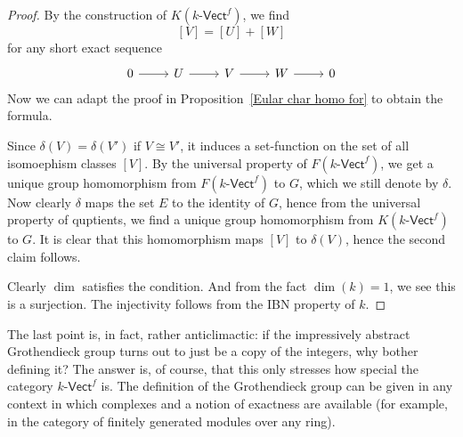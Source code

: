 \begin{proof}
By the construction of $K(\text{$k$-$\mathsf{Vect}^{f}$})$, we find
\[[V]=[U]+[W]\]
for any short exact sequence
\[\begin{tikzcd}
0\ar[r]&U\ar[r]&V\ar[r]&W\ar[r]&0
\end{tikzcd}\]
Now we can adapt the proof in Proposition~\ref{Eular char homo for} to obtain the formula.\par
Since $\delta(V)=\delta(V')$ if $V\cong V'$, it induces a set-function on the set of all isomoephism classes $[V]$. By the universal property of $F(\text{$k$-$\mathsf{Vect}^{f}$})$, we get a unique group homomorphism from $F(\text{$k$-$\mathsf{Vect}^{f}$})$ to $G$, which we still denote by $\delta$. Now clearly $\delta$ maps the set $E$ to the identity of $G$, hence from the universal property of quptients, we find a unique group homomorphism from $K(\text{$k$-$\mathsf{Vect}^{f}$})$ to $G$. It is clear that this homomorphism maps $[V]$ to $\delta(V)$, hence the second claim follows.\par
Clearly $\dim$ satisfies the condition. And from the fact $\dim(k)=1$, we see this is a surjection. The injectivity follows from the IBN property of $k$.
\end{proof}
The last point is, in fact, rather anticlimactic: if the impressively abstract Grothendieck group turns out to just be a copy of the integers, why bother defining it? The answer is, of course, that this only stresses how special the category $k$-$\mathsf{Vect}^f$ is. The definition of the Grothendieck group can be given in any context in which complexes and a notion of exactness are available (for example, in the category of finitely generated modules over any ring).
